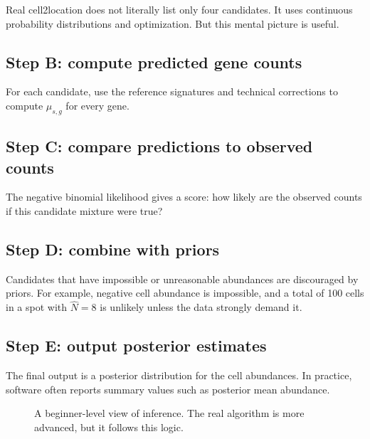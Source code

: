 \documentclass[11pt]{article}
\begin{document}
Real cell2location does not literally list only four candidates. It uses continuous probability distributions and optimization. But this mental picture is useful.

\subsection{Step B: compute predicted gene counts}

For each candidate, use the reference signatures and technical corrections to compute $\mu_{s,g}$ for every gene.

\subsection{Step C: compare predictions to observed counts}

The negative binomial likelihood gives a score: how likely are the observed counts if this candidate mixture were true?

\subsection{Step D: combine with priors}

Candidates that have impossible or unreasonable abundances are discouraged by priors. For example, negative cell abundance is impossible, and a total of 100 cells in a spot with $\hat N=8$ is unlikely unless the data strongly demand it.

\subsection{Step E: output posterior estimates}

The final output is a posterior distribution for the cell abundances. In practice, software often reports summary values such as posterior mean abundance.

\begin{figure}[H]
\centering
{}
\caption{A beginner-level view of inference. The real algorithm is more advanced, but it follows this logic.}
\end{figure}
\end{document}
